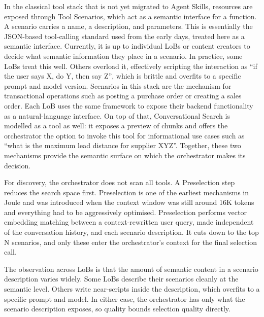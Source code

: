 In the classical tool stack that is not yet migrated to Agent Skills, resources are exposed through Tool Scenarios, which act as a semantic interface for a function. A scenario carries a name, a description, and parameters. This is essentially the JSON-based tool-calling standard used from the early days, treated here as a semantic interface. Currently, it is up to individual LoBs or content creators to decide what semantic information they place in a scenario. In practice, some LoBs treat this well. Others overload it, effectively scripting the interaction as ``if the user says X, do Y, then say Z'', which is brittle and overfits to a specific prompt and model version. Scenarios in this stack are the mechanism for transactional operations such as posting a purchase order or creating a sales order. Each LoB uses the same framework to expose their backend functionality as a natural-language interface. On top of that, Conversational Search is modelled as a tool as well: it exposes a preview of chunks and offers the orchestrator the option to invoke this tool for informational use cases such as ``what is the maximum lead distance for supplier XYZ''. Together, these two mechanisms provide the semantic surface on which the orchestrator makes its decision.

\medskip{}

For discovery, the orchestrator does not scan all tools. A Preselection step reduces the search space first. Preselection is one of the earliest mechanisms in Joule and was introduced when the context window was still around 16K tokens and everything had to be aggressively optimised. Preselection performs vector embedding matching between a context-rewritten user query, made independent of the conversation history, and each scenario description. It cuts down to the top N scenarios, and only these enter the orchestrator's context for the final selection call.

\medskip{}

The observation across LoBs is that the amount of semantic content in a scenario description varies widely. Some LoBs describe their scenarios cleanly at the semantic level. Others write near-scripts inside the description, which overfits to a specific prompt and model. In either case, the orchestrator has only what the scenario description exposes, so quality bounds selection quality directly.

